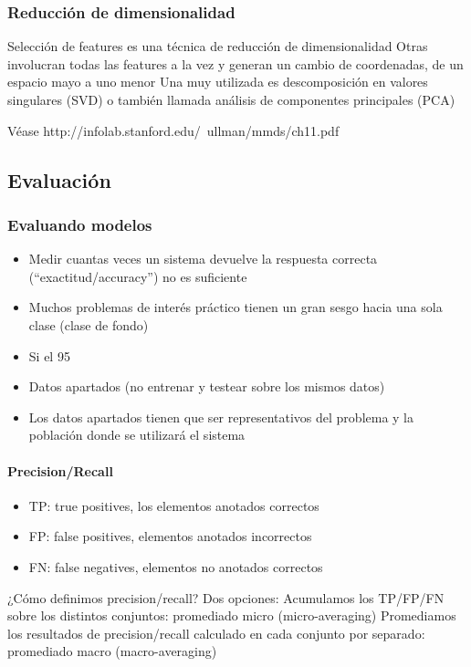 \documentclass[a4paper,11pt,spanish]{book}
\begin{document}
      \subsubsection{Reducción de dimensionalidad}
	Selección de features es una técnica de reducción de dimensionalidad
	Otras involucran todas las features a la vez y generan un cambio de coordenadas, de un espacio mayo a uno menor
	Una muy utilizada es descomposición en valores singulares (SVD) o también llamada análisis de componentes principales (PCA)

	Véase http://infolab.stanford.edu/~ullman/mmds/ch11.pdf

      \subsection{Evaluación}

	\subsubsection {Evaluando modelos}
	  \begin{itemize}
	    \item Medir cuantas veces un sistema devuelve la respuesta correcta (“exactitud/accuracy”) no es suficiente
	    \item Muchos problemas de interés práctico tienen un gran sesgo hacia una sola clase (clase de fondo)
	    \item Si el 95%
	    \item Datos apartados (no entrenar y testear sobre los mismos datos)
	    \item Los datos apartados tienen que ser representativos del problema y la población donde se utilizará el sistema
	  \end{itemize}

	\paragraph {Precision/Recall}
	  \begin{itemize}	
	    \item TP: true positives, los elementos anotados correctos
	    \item FP: false positives, elementos anotados incorrectos
	    \item FN: false negatives, elementos no anotados correctos
	  \end{itemize}
	  ¿Cómo definimos precision/recall?
	  Dos opciones:
	  Acumulamos los TP/FP/FN sobre los distintos conjuntos: promediado micro (micro-averaging)
	  Promediamos los resultados de precision/recall calculado en cada conjunto por separado: promediado macro (macro-averaging)
\end{document}
